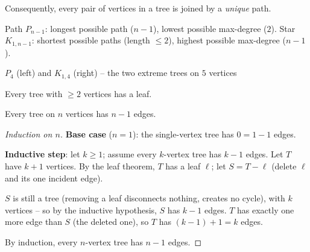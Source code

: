 \documentclass[11pt]{article}
\begin{document}
\begin{note}
Consequently, every pair of vertices in a tree is joined by a \emph{unique} path.
\end{note}

\begin{note}
Path $P_{n-1}$: longest possible path ($n-1$), lowest possible max-degree ($2$). Star $K_{1,n-1}$: shortest possible paths (length $\le2$), highest possible max-degree ($n-1$).
\end{note}

\begin{center}
\qquad
{}
\end{center}
\begin{center}
\small $P_4$ (left) and $K_{1,4}$ (right) -- the two extreme trees on $5$ vertices
\end{center}

\bigskip
\begin{theorem}[CN Thm 67]
Every tree with $\ge2$ vertices has a leaf.
\end{theorem}

\begin{theorem}
Every tree on $n$ vertices has $n-1$ edges.
\end{theorem}
\begin{proof}[Induction on $n$]
\textbf{Base case} ($n=1$): the single-vertex tree has $0=1-1$ edges.

\medskip
\textbf{Inductive step}: let $k\ge1$; assume every $k$-vertex tree has $k-1$ edges. Let $T$ have $k+1$ vertices. By the leaf theorem, $T$ has a leaf $\ell$; let $S=T-\ell$ (delete $\ell$ and its one incident edge).

$S$ is still a tree (removing a leaf disconnects nothing, creates no cycle), with $k$ vertices -- so by the inductive hypothesis, $S$ has $k-1$ edges. $T$ has exactly one more edge than $S$ (the deleted one), so $T$ has $(k-1)+1=k$ edges.

\medskip
By induction, every $n$-vertex tree has $n-1$ edges.
\end{proof}
\end{document}
